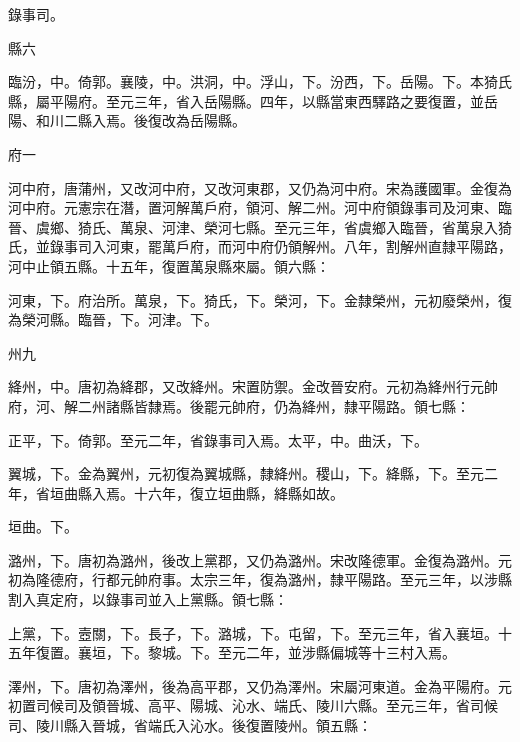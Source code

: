 \begin{pinyinscope}
 錄事司。



 縣六



 臨汾，中。倚郭。襄陵，中。洪洞，中。浮山，下。汾西，下。岳陽。下。本猗氏縣，屬平陽府。至元三年，省入岳陽縣。四年，以縣當東西驛路之要復置，並岳陽、和川二縣入焉。後復改為岳陽縣。



 府一



 河中府，唐蒲州，又改河中府，又改河東郡，又仍為河中府。宋為護國軍。金復為河中府。元憲宗在潛，置河解萬戶府，領河、解二州。河中府領錄事司及河東、臨晉、虞鄉、猗氏、萬泉、河津、榮河七縣。至元三年，省虞鄉入臨晉，省萬泉入猗氏，並錄事司入河東，罷萬戶府，而河中府仍領解州。八年，割解州直隸平陽路，河中止領五縣。十五年，復置萬泉縣來屬。領六縣：



 河東，下。府治所。萬泉，下。猗氏，下。榮河，下。金隸榮州，元初廢榮州，復為榮河縣。臨晉，下。河津。下。



 州九



 絳州，中。唐初為絳郡，又改絳州。宋置防禦。金改晉安府。元初為絳州行元帥府，河、解二州諸縣皆隸焉。後罷元帥府，仍為絳州，隸平陽路。領七縣：



 正平，下。倚郭。至元二年，省錄事司入焉。太平，中。曲沃，下。



 翼城，下。金為翼州，元初復為翼城縣，隸絳州。稷山，下。絳縣，下。至元二年，省垣曲縣入焉。十六年，復立垣曲縣，絳縣如故。



 垣曲。下。



 潞州，下。唐初為潞州，後改上黨郡，又仍為潞州。宋改隆德軍。金復為潞州。元初為隆德府，行都元帥府事。太宗三年，復為潞州，隸平陽路。至元三年，以涉縣割入真定府，以錄事司並入上黨縣。領七縣：



 上黨，下。壼關，下。長子，下。潞城，下。屯留，下。至元三年，省入襄垣。十五年復置。襄垣，下。黎城。下。至元二年，並涉縣偏城等十三村入焉。



 澤州，下。唐初為澤州，後為高平郡，又仍為澤州。宋屬河東道。金為平陽府。元初置司候司及領晉城、高平、陽城、沁水、端氏、陵川六縣。至元三年，省司候司、陵川縣入晉城，省端氏入沁水。後復置陵州。領五縣：




\end{pinyinscope}
